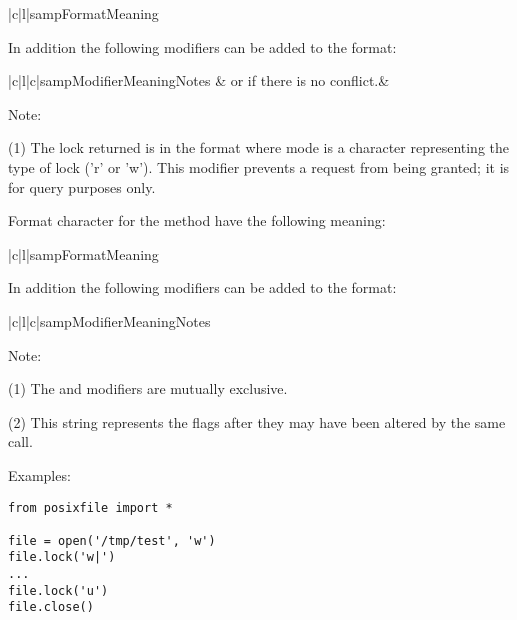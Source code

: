 \begin{tableii}{|c|l|}{samp}{Format}{Meaning}
\end{tableii}

In addition the following modifiers can be added to the format:

\begin{tableiii}{|c|l|c|}{samp}{Modifier}{Meaning}{Notes}
  {}&{\hskip0.5cm or  if there is no conflict.}&{}\\
\end{tableiii}

Note:

(1) The lock returned is in the format  where mode is a character representing the type of lock
('r' or 'w').  This modifier prevents a request from being granted; it
is for query purposes only.

Format character for the  method have the following meaning:

\begin{tableii}{|c|l|}{samp}{Format}{Meaning}
\end{tableii}

In addition the following modifiers can be added to the format:

\begin{tableiii}{|c|l|c|}{samp}{Modifier}{Meaning}{Notes}
\end{tableiii}

Note:

(1) The \code{!} and \code{=} modifiers are mutually exclusive.

(2) This string represents the flags after they may have been altered
by the same call.

Examples:

\bcode\begin{verbatim}
from posixfile import *

file = open('/tmp/test', 'w')
file.lock('w|')
...
file.lock('u')
file.close()
\end{verbatim}\ecode
